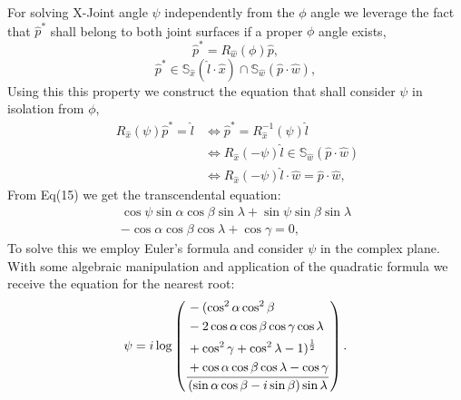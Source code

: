 \documentclass[a4paper,twocolumn,10pt]{article}
\begin{document}
For solving X-Joint angle $\psi$ independently from the $\phi$ angle we
leverage the fact that $\hat p^*$ shall belong to both joint surfaces if a 
proper $\phi$ angle exists,
\begin{equation}
    \hat p^* = R_{\hat w}(\phi) \hat p,
\end{equation}
\begin{equation}
    \hat p^* \in \mathbb{S}_{\hat x}(\hat l \cdot \hat x) 
    \cap \mathbb{S}_{\hat w}(\hat p \cdot \hat w),
\end{equation}
Using this this property we construct the equation that shall consider $\psi$
in isolation from $\phi$,
\begin{align}
        \;R_{\hat x}(\psi)\hat p^* = \hat l 
        & \iff \hat p^* = R_{\hat x}^{-1}(\psi) \hat l\\
        & \iff R_{\hat x}(-\psi) \hat l
        \in \mathbb{S}_{\hat w}(\hat p \cdot \hat w) \\
        & \iff R_{\hat x}(-\psi) \hat l \cdot \hat w = \hat p \cdot \hat w,
\end{align}
From Eq(15) we get the transcendental equation:
\begin{equation}
   \begin{split}
       \cos\psi \sin\alpha \cos\beta \sin\lambda +
       \sin\psi \sin\beta \sin\lambda \\ 
       - \cos\alpha \cos\beta \cos\lambda +
       \cos \gamma = 0,
   \end{split}
\end{equation}
To solve this we employ Euler's formula and consider $\psi$ in the complex 
plane. With some algebraic manipulation and application of the quadratic
formula we receive the equation for the nearest root: 
\begin{equation}
    \psi = i \log\left(
        \vcenter{\hbox{$\displaystyle
        \frac{
            \begin{split}
                &-(\cos^{2}{\alpha } \cos^{2}{\beta } \\
                &- 2 \cos{\alpha } \cos{\beta } \cos{\gamma } \cos{\lambda } \\
                &+ \cos^{2}{\gamma } + \cos^{2}{\lambda } - 1)^{\frac{1}{2}} \\
                &+ \cos{\alpha } \cos{\beta } \cos{\lambda } - \cos{\gamma }
            \end{split}
        }
        {
            (\sin{\alpha } \cos{\beta } - i \sin{\beta }) \sin{\lambda }
        }$}}
    \right).
\end{equation}
\end{document}

